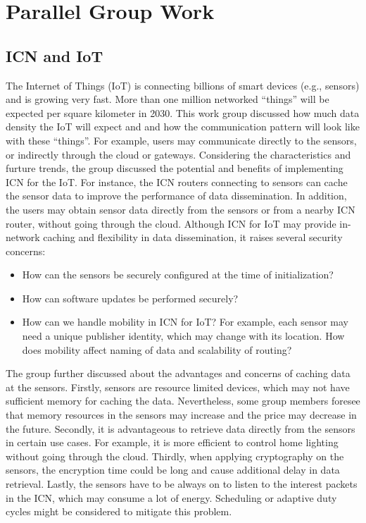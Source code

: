 \section{Parallel Group Work} \label{sec:group-work}
\subsection{ICN and IoT}

The Internet of Things (IoT) is connecting billions of smart devices (e.g., sensors) and is growing very fast. More than one million networked ``things'' will be expected per square kilometer in 2030. This work group discussed how much data density the IoT will expect and and how the communication pattern will look like with these ``things''. For example, users may communicate directly to the sensors, or indirectly through the cloud or gateways. Considering the characteristics and furture trends, the group discussed the potential and benefits of implementing ICN for the IoT. For instance, the ICN routers connecting to sensors can cache the sensor data to improve the performance of data dissemination. In addition, the users may obtain sensor data directly from the sensors or from a nearby ICN router, without going through the cloud. Although ICN for IoT may provide in-network caching and flexibility in data dissemination, it raises several security concerns:

\begin{itemize}
\item How can the sensors be securely configured at the time of initialization?
\item How can software updates be performed securely?
\item How can we handle mobility in ICN for IoT? For example, each sensor may need a unique publisher identity, which may change with its location. How does mobility affect naming of data and scalability of routing?
\end{itemize}

The group further discussed about the advantages and concerns of caching data at the sensors. Firstly, sensors are resource limited devices, which may not have sufficient memory for caching the data. Nevertheless, some group members foresee that memory resources in the sensors may increase and the price may decrease in the future. Secondly, it is advantageous to retrieve data directly from the sensors in certain use cases. For example, it is more efficient to control home lighting without going through the cloud. Thirdly, when applying cryptography on  the sensors, the encryption time could be long and cause additional delay in data retrieval. Lastly, the sensors have to be always on to listen to the interest packets in the ICN, which may consume a lot of energy. Scheduling or adaptive duty cycles might be considered to mitigate this problem.

